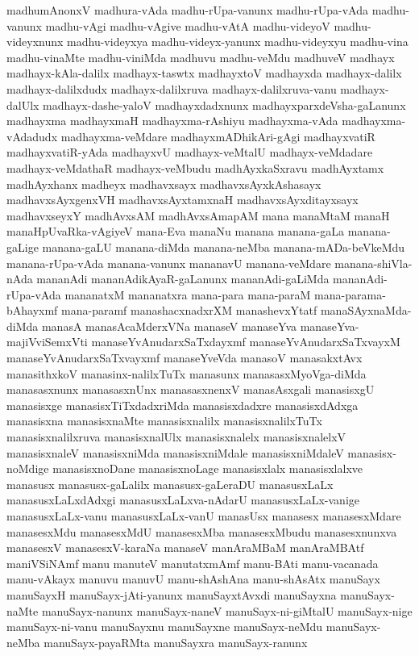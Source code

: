 {madhumAnonxV
madhura-vAda
madhu-rUpa-vanunx
madhu-rUpa-vAda
madhu-vanunx
madhu-vAgi
madhu-vAgive
madhu-vAtA
madhu-videyoV
madhu-videyxnunx
madhu-videyxya
madhu-videyx-yanunx
madhu-videyxyu
madhu-vina
madhu-vinaMte
madhu-viniMda
madhuvu
madhu-veMdu
madhuveV
madhayx
madhayx-kAla-dalilx
madhayx-taswtx
madhayxtoV
madhayxda
madhayx-dalilx
madhayx-dalilxdudx
madhayx-dalilxruva
madhayx-dalilxruva-vanu
madhayx-dalUlx
madhayx-dashe-yaloV
madhayxdadxnunx
madhayxparxdeVsha-gaLanunx
madhayxma
madhayxmaH
madhayxma-rAshiyu
madhayxma-vAda
madhayxma-vAdadudx
madhayxma-veMdare
madhayxmADhikAri-gAgi
madhayxvatiR
madhayxvatiR-yAda
madhayxvU
madhayx-veMtalU
madhayx-veMdadare
madhayx-veMdathaR
madhayx-veMbudu
madhAyxkaSxravu
madhAyxtamx
madhAyxhanx
madheyx
madhavxsayx
madhavxsAyxkAshasayx
madhavxsAyxgenxVH
madhavxsAyxtamxnaH
madhavxsAyxditayxsayx
madhavxseyxY
madhAvxsAM
madhAvxsAmapAM
mana
manaMtaM
manaH
manaHpUvaRka-vAgiyeV
mana-Eva
manaNu
manana
manana-gaLa
manana-gaLige
manana-gaLU
manana-diMda
manana-neMba
manana-mADa-beVkeMdu
manana-rUpa-vAda
manana-vanunx
mananavU
manana-veMdare
manana-shiVla-nAda
mananAdi
mananAdikAyaR-gaLanunx
mananAdi-gaLiMda
mananAdi-rUpa-vAda
mananatxM
mananatxra
mana-para
mana-paraM
mana-parama-bAhayxmf
mana-paramf
manashacxnadxrXM
manashevxYtatf
manaSAyxnaMda-diMda
manasA
manasAcaMderxVNa
manaseV
manaseYva
manaseYva-majiVviSemxVti
manaseYvAnudarxSaTxdayxmf
manaseYvAnudarxSaTxvayxM
manaseYvAnudarxSaTxvayxmf
manaseYveVda
manasoV
manasakxtAvx
manasithxkoV
manasinx-nalilxTuTx
manasunx
manasasxMyoVga-diMda
manasasxnunx
manasasxnUnx
manasasxnenxV
manasAsxgali
manasisxgU
manasisxge
manasisxTiTxdadxriMda
manasisxdadxre
manasisxdAdxga
manasisxna
manasisxnaMte
manasisxnalilx
manasisxnalilxTuTx
manasisxnalilxruva
manasisxnalUlx
manasisxnalelx
manasisxnalelxV
manasisxnaleV
manasisxniMda
manasisxniMdale
manasisxniMdaleV
manasisx-noMdige
manasisxnoDane
manasisxnoLage
manasisxlalx
manasisxlalxve
manasusx
manasusx-gaLalilx
manasusx-gaLeraDU
manasusxLaLx
manasusxLaLxdAdxgi
manasusxLaLxva-nAdarU
manasusxLaLx-vanige
manasusxLaLx-vanu
manasusxLaLx-vanU
manasUsx
manasesx
manasesxMdare
manasesxMdu
manasesxMdU
manasesxMba
manasesxMbudu
manasesxnunxva
manasesxV
manasesxV-karaNa
manaseV
manAraMBaM
manAraMBAtf
maniVSiNAmf
manu
manuteV
manutatxmAmf
manu-BAti
manu-vacanada
manu-vAkayx
manuvu
manuvU
manu-shAshAna
manu-shAsAtx
manuSayx
manuSayxH
manuSayx-jAti-yanunx
manuSayxtAvxdi
manuSayxna
manuSayx-naMte
manuSayx-nanunx
manuSayx-naneV
manuSayx-ni-giMtalU
manuSayx-nige
manuSayx-ni-vanu
manuSayxnu
manuSayxne
manuSayx-neMdu
manuSayx-neMba
manuSayx-payaRMta
manuSayxra
manuSayx-ranunx
}
